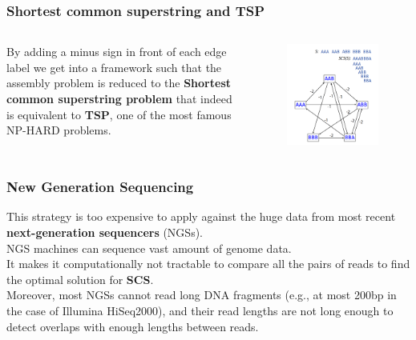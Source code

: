 \begin{frame}
\frametitle{Shortest common superstring and TSP}
\begin{columns}
	By adding a minus sign in front of each edge label we get into a framework
	such that the assembly problem is reduced to the \textbf{Shortest common superstring problem} that indeed is equivalent to \textbf{TSP}, one of the most famous NP-HARD problems.
	\begin{figure}
		\includegraphics[scale=0.25]{img/tsp-scs.png}
	\end{figure}
\end{columns}
\end{frame}

\begin{frame}
\frametitle{New Generation Sequencing}
This strategy is too expensive to apply against the huge data from most recent \textbf{next-generation sequencers } (NGSs). 
\\ \medskip
NGS machines can sequence vast amount of genome data. 
\\
It makes it computationally not tractable to compare all the pairs of reads to find the optimal solution for \textbf{SCS}. 
\\ \medskip
Moreover, most NGSs cannot read long DNA fragments (e.g., at most 200bp in the case of Illumina HiSeq2000),
and their read lengths are not long enough to detect overlaps with enough lengths between reads.
\end{frame}

